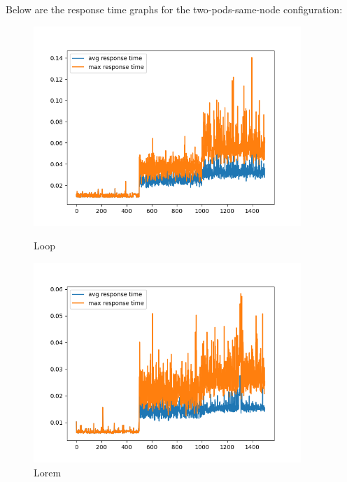 \noindent Below are the response time graphs for the two-pods-same-node configuration:

\begin{figure}[h]
    \begin{minipage}[t]{0.5\textwidth}
        \centering
        \includegraphics[width=0.9\textwidth]{../sample_results/loop/two-pod-same-node/response-time-two-pod-same-node-two-pod-same-node.png}
        \caption{Loop}
    \end{minipage}
    \hfill
    \begin{minipage}[t]{0.5\textwidth}
        \centering
        \includegraphics[width=0.9\textwidth]{../sample_results/lorem/two-pod-same-node/response-time-two-pod-same-node-two-pod-same-node.png}
        \caption{Lorem}
    \end{minipage}
\end{figure}

